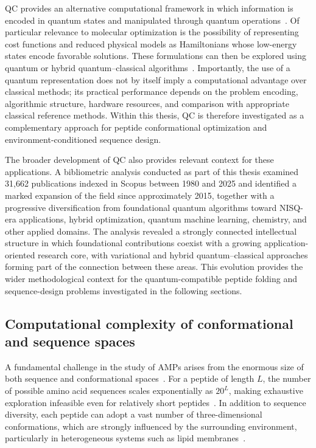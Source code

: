 QC provides an alternative computational framework in which information is encoded in quantum states and manipulated through quantum operations~\cite{q_adv}. Of particular relevance to molecular optimization is the possibility of representing cost functions and reduced physical models as Hamiltonians whose low-energy states encode favorable solutions. These formulations can then be explored using quantum or hybrid quantum--classical algorithms~\cite{robert2021resource}. Importantly, the use of a quantum representation does not by itself imply a computational advantage over classical methods; its practical performance depends on the problem encoding, algorithmic structure, hardware resources, and comparison with appropriate classical reference methods. Within this thesis, QC is therefore investigated as a complementary approach for peptide conformational optimization and environment-conditioned sequence design.

The broader development of QC also provides relevant context for these applications. A bibliometric analysis conducted as part of this thesis examined 31,662 publications indexed in Scopus between 1980 and 2025 and identified a marked expansion of the field since approximately 2015, together with a progressive diversification from foundational quantum algorithms toward NISQ-era applications, hybrid optimization, quantum machine learning, chemistry, and other applied domains. The analysis revealed a strongly connected intellectual structure in which foundational contributions coexist with a growing application-oriented research core, with variational and hybrid quantum–classical approaches forming part of the connection between these areas. This evolution provides the wider methodological context for the quantum-compatible peptide folding and sequence-design problems investigated in the following sections.

\subsection{Computational complexity of conformational and sequence spaces}

A fundamental challenge in the study of AMPs arises from the enormous size of both sequence and conformational spaces~\cite{robert2021resource}. For a peptide of length \(L\), the number of possible amino acid sequences scales exponentially as \(20^L\), making exhaustive exploration infeasible even for relatively short peptides~\cite{robert2021resource}. In addition to sequence diversity, each peptide can adopt a vast number of three-dimensional conformations, which are strongly influenced by the surrounding environment, particularly in heterogeneous systems such as lipid membranes~\cite{Zasloff2002}.

